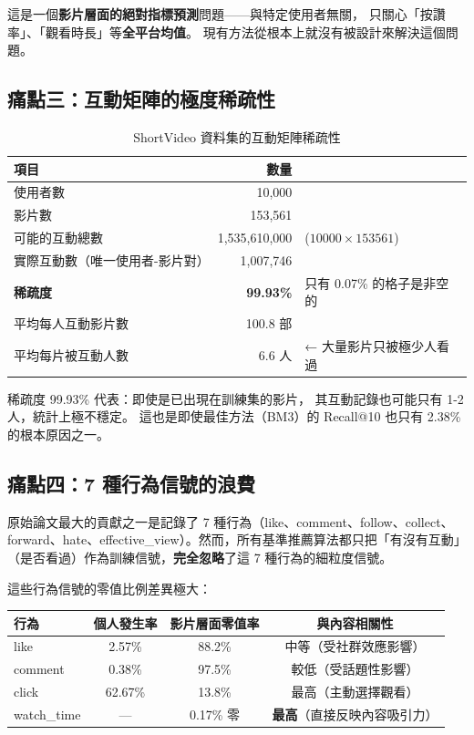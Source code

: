 \documentclass[12pt, a4paper]{article}
\begin{document}
這是一個\textbf{影片層面的絕對指標預測}問題——與特定使用者無關，
只關心「按讚率」、「觀看時長」等\textbf{全平台均值}。
現有方法從根本上就沒有被設計來解決這個問題。

\subsection{痛點三：互動矩陣的極度稀疏性}

\begin{table}[H]
\centering
\caption{ShortVideo 資料集的互動矩陣稀疏性}
\small
\begin{tabular}{lrl}
\toprule
\textbf{項目} & \textbf{數量} & \\
\midrule
使用者數 & 10,000 & \\
影片數   & 153,561 & \\
可能的互動總數 & 1,535,610,000 & ($10000 \times 153561$) \\
實際互動數（唯一使用者-影片對） & 1,007,746 & \\
\textbf{稀疏度} & \textbf{99.93\%} & 只有 0.07\% 的格子是非空的 \\
\midrule
平均每人互動影片數 & 100.8 部 & \\
平均每片被互動人數 & 6.6 人  & ← 大量影片只被極少人看過 \\
\bottomrule
\end{tabular}
\end{table}

稀疏度 99.93\% 代表：即使是已出現在訓練集的影片，
其互動記錄也可能只有 1-2 人，統計上極不穩定。
這也是即使最佳方法（BM3）的 Recall@10 也只有 2.38\% 的根本原因之一。

\subsection{痛點四：7 種行為信號的浪費}

原始論文最大的貢獻之一是記錄了 7 種行為（like、comment、follow、collect、
forward、hate、effective\_view）。然而，所有基準推薦算法都只把「有沒有互動」
（是否看過）作為訓練信號，\textbf{完全忽略}了這 7 種行為的細粒度信號。

這些行為信號的零值比例差異極大：

\begin{center}
\begin{tabular}{lccc}
\toprule
行為 & 個人發生率 & 影片層面零值率 & 與內容相關性 \\
\midrule
like    & 2.57\% & 88.2\% & 中等（受社群效應影響） \\
comment & 0.38\% & 97.5\% & 較低（受話題性影響） \\
click   & 62.67\% & 13.8\% & 最高（主動選擇觀看） \\
watch\_time & — & 0.17\% 零 & \textbf{最高}（直接反映內容吸引力） \\
\bottomrule
\end{tabular}
\end{center}
\end{document}
